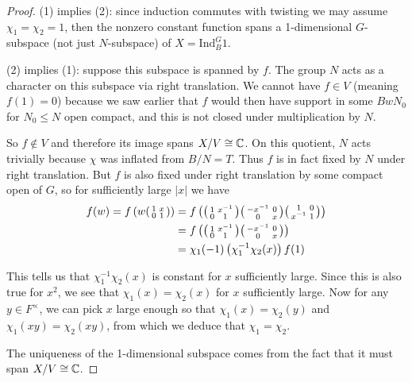 \begin{proof}
    (1) implies (2): since induction commutes with twisting we may assume $\chi_1=\chi_2=1$, then the nonzero constant function spans a 1-dimensional $G$-subspace (not just $N$-subspace) of $X = \mathrm{Ind}_B^G 1$.

    (2) implies (1): suppose this subspace is spanned by $f$. The group $N$ acts as a character on this subspace via right translation. We cannot have $f \in V$ (meaning $f(1)=0$) because we saw earlier that $f$ would then have support in some $BwN_0$ for $N_0 \leq N$ open compact, and this is not closed under multiplication by $N$.

    So $f \not\in V$ and therefore its image spans $X/V \cong \mathbb{C}$. On this quotient, $N$ acts trivially because $\chi$ was inflated from $B/N=T$. Thus $f$ is in fact fixed by $N$ under right translation. But $f$ is also fixed under right translation by some compact open of $G$, so for sufficiently large $|x|$ we have
    \begin{equation*}
        \begin{split}
            f(w) = f\left(w \begin{psmallmatrix}
                1&x \\0 & 1
            \end{psmallmatrix}\right) &= f\left( \begin{psmallmatrix}
                1&x^{-1} \\0 & 1
            \end{psmallmatrix}\begin{psmallmatrix}
                -x^{-1}&0 \\0 & x
            \end{psmallmatrix}\begin{psmallmatrix}
                1&0 \\x^{-1} & 1
            \end{psmallmatrix}\right) \\
            &= f\left( \begin{psmallmatrix}
                1&x^{-1} \\0 & 1
            \end{psmallmatrix}\begin{psmallmatrix}
                -x^{-1}&0 \\0 & x
            \end{psmallmatrix}\right) \\
            &= \chi_1(-1) \left( \chi_1^{-1}\chi_2(x)\right) f(1)
        \end{split}
    \end{equation*}

    This tells us that $\chi_1^{-1}\chi_2(x)$ is constant for $x$ sufficiently large. Since this is also true for $x^2$, we see that $\chi_1(x)=\chi_2(x)$ for $x$ sufficiently large. Now for any $y \in F^\times$, we can pick $x$ large enough so that $\chi_1(x)=\chi_2(y)$ and $\chi_1(xy)=\chi_2(xy)$, from which we deduce that $\chi_1=\chi_2$. 
    
    The uniqueness of the 1-dimensional subspace comes from the fact that it must span $X/V \cong \mathbb{C}$. 
\end{proof}

